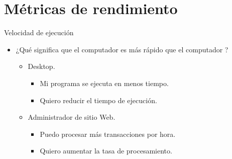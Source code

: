 \section{Métricas de rendimiento}

\begin{frame}[t]{Velocidad de ejecución}
\begin{itemize}
  \item ¿Qué significa que el computador  es más rápido
        que el computador ?
    \begin{itemize}
      \item Desktop.
        \begin{itemize}
          \item Mi programa se ejecuta en menos tiempo.
          \item Quiero reducir el tiempo de ejecución.
        \end{itemize}
      \item Administrador de sitio Web.
        \begin{itemize}
          \item Puedo procesar más transacciones por hora.
          \item Quiero aumentar la tasa de procesamiento.
        \end{itemize}
    \end{itemize}
\end{itemize}
\end{frame}

